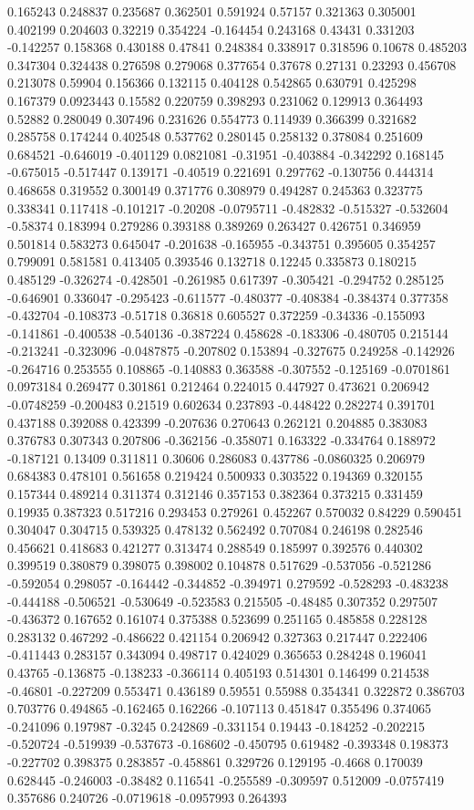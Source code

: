 0.165243 0.248837 0.235687 0.362501 0.591924 0.57157 0.321363 0.305001 0.402199 0.204603 0.32219 0.354224 -0.164454 0.243168 0.43431 0.331203 -0.142257 0.158368 0.430188 0.47841 0.248384 0.338917 0.318596 0.10678 0.485203 0.347304 0.324438 0.276598 0.279068 0.377654 0.37678 0.27131 0.23293 0.456708 0.213078 0.59904 0.156366 0.132115 0.404128 0.542865 0.630791 0.425298 0.167379 0.0923443 0.15582 0.220759 0.398293 0.231062 0.129913 0.364493 0.52882 0.280049 0.307496 0.231626 0.554773 0.114939 0.366399 0.321682 0.285758 0.174244 0.402548 0.537762 0.280145 0.258132 0.378084 0.251609 0.684521 -0.646019 -0.401129 0.0821081 -0.31951 -0.403884 -0.342292 0.168145 -0.675015 -0.517447 0.139171 -0.40519 0.221691 0.297762 -0.130756 0.444314 0.468658 0.319552 0.300149 0.371776 0.308979 0.494287 0.245363 0.323775 0.338341 0.117418 -0.101217 -0.20208 -0.0795711 -0.482832 -0.515327 -0.532604 -0.58374 0.183994 0.279286 0.393188 0.389269 0.263427 0.426751 0.346959 0.501814 0.583273 0.645047 -0.201638 -0.165955 -0.343751 0.395605 0.354257 0.799091 0.581581 0.413405 0.393546 0.132718 0.12245 0.335873 0.180215 0.485129 -0.326274 -0.428501 -0.261985 0.617397 -0.305421 -0.294752 0.285125 -0.646901 0.336047 -0.295423 -0.611577 -0.480377 -0.408384 -0.384374 0.377358 -0.432704 -0.108373 -0.51718 0.36818 0.605527 0.372259 -0.34336 -0.155093 -0.141861 -0.400538 -0.540136 -0.387224 0.458628 -0.183306 -0.480705 0.215144 -0.213241 -0.323096 -0.0487875 -0.207802 0.153894 -0.327675 0.249258 -0.142926 -0.264716 0.253555 0.108865 -0.140883 0.363588 -0.307552 -0.125169 -0.0701861 0.0973184 0.269477 0.301861 0.212464 0.224015 0.447927 0.473621 0.206942 -0.0748259 -0.200483 0.21519 0.602634 0.237893 -0.448422 0.282274 0.391701 0.437188 0.392088 0.423399 -0.207636 0.270643 0.262121 0.204885 0.383083 0.376783 0.307343 0.207806 -0.362156 -0.358071 0.163322 -0.334764 0.188972 -0.187121 0.13409 0.311811 0.30606 0.286083 0.437786 -0.0860325 0.206979 0.684383 0.478101 0.561658 0.219424 0.500933 0.303522 0.194369 0.320155 0.157344 0.489214 0.311374 0.312146 0.357153 0.382364 0.373215 0.331459 0.19935 0.387323 0.517216 0.293453 0.279261 0.452267 0.570032 0.84229 0.590451 0.304047 0.304715 0.539325 0.478132 0.562492 0.707084 0.246198 0.282546 0.456621 0.418683 0.421277 0.313474 0.288549 0.185997 0.392576 0.440302 0.399519 0.380879 0.398075 0.398002 0.104878 0.517629 -0.537056 -0.521286 -0.592054 0.298057 -0.164442 -0.344852 -0.394971 0.279592 -0.528293 -0.483238 -0.444188 -0.506521 -0.530649 -0.523583 0.215505 -0.48485 0.307352 0.297507 -0.436372 0.167652 0.161074 0.375388 0.523699 0.251165 0.485858 0.228128 0.283132 0.467292 -0.486622 0.421154 0.206942 0.327363 0.217447 0.222406 -0.411443 0.283157 0.343094 0.498717 0.424029 0.365653 0.284248 0.196041 0.43765 -0.136875 -0.138233 -0.366114 0.405193 0.514301 0.146499 0.214538 -0.46801 -0.227209 0.553471 0.436189 0.59551 0.55988 0.354341 0.322872 0.386703 0.703776 0.494865 -0.162465 0.162266 -0.107113 0.451847 0.355496 0.374065 -0.241096 0.197987 -0.3245 0.242869 -0.331154 0.19443 -0.184252 -0.202215 -0.520724 -0.519939 -0.537673 -0.168602 -0.450795 0.619482 -0.393348 0.198373 -0.227702 0.398375 0.283857 -0.458861 0.329726 0.129195 -0.4668 0.170039 0.628445 -0.246003 -0.38482 0.116541 -0.255589 -0.309597 0.512009 -0.0757419 0.357686 0.240726 -0.0719618 -0.0957993 0.264393 